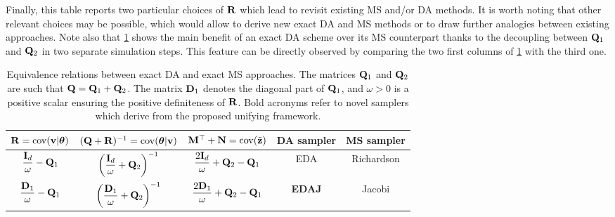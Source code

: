 \documentclass[nohypdvips,onefignum,onetabnum]{siamart171218}
\begin{document}
Finally, this table reports two particular choices of $\mathbf{R}$ which lead to revisit existing MS and/or DA methods. It is worth noting that other relevant choices may be possible, which would allow to derive new exact DA and MS methods or to draw further analogies between existing approaches. Note also that \cref{table:DA_matrix_splitting} shows the main benefit of an exact DA scheme over its MS counterpart thanks to the decoupling between $\mathbf{Q}_1$ and $\mathbf{Q}_2$ in two separate simulation steps. 
This feature can be directly observed by comparing the two first columns of \cref{table:DA_matrix_splitting} with the third one.
\begin{table}
{\footnotesize
  \caption{Equivalence relations between exact DA and exact MS approaches. The matrices $\mathbf{Q}_1$ and $\mathbf{Q}_2$ are such that $\mathbf{Q} = \mathbf{Q}_1 + \mathbf{Q}_2$. The matrix $\mathbf{D}_1$ denotes the diagonal part of $\mathbf{Q}_1$, and $\omega>0$ is a positive scalar ensuring the positive definiteness of $\mathbf{R}$.
  Bold acronyms refer to novel samplers which derive from the proposed unifying framework.} 
  \label{table:DA_matrix_splitting}
  \begin{center}
   {\renewcommand{\arraystretch}{1.5}
    \begin{tabular}{|c|c|c|c|c|} 
      \hline
      $\mathbf{R}=\mathrm{cov}(\mathbf{v}|\boldsymbol{\theta})$ 
      & $(\mathbf{Q} + \mathbf{R})^{-1}=\mathrm{cov}(\boldsymbol{\theta}|\mathbf{v})$ 
      & $\mathbf{M}^{\top} + \mathbf{N}=\mathrm{cov}(\tilde{\mathbf{z}})$ 
      & DA sampler & MS sampler \\
      \hline 
      $\dfrac{\mathbf{I}_d}{\omega} - \mathbf{Q}_1$ 
      & $\left(\dfrac{\mathbf{I}_d}{\omega} + \mathbf{Q}_2\right)^{-1}$ 
      & $\dfrac{2\mathbf{I}_d}{\omega} + \mathbf{Q}_2 - \mathbf{Q}_1$ 
      & EDA \cite{Marnissi2019} & Richardson \cite{Fox2017} \\
      $\dfrac{\mathbf{D}_1}{\omega} - \mathbf{Q}_1$ 
      & $\left(\dfrac{\mathbf{D}_1}{\omega} + \mathbf{Q}_2\right)^{-1}$ 
      & $\dfrac{2\mathbf{D}_1}{\omega} + \mathbf{Q}_2 - \mathbf{Q}_1$ 
      & {\bf EDAJ} & Jacobi \cite{Fox2017} \\[1em]
      \hline
    \end{tabular}}
  \end{center}
}
\end{table}
\end{document}
